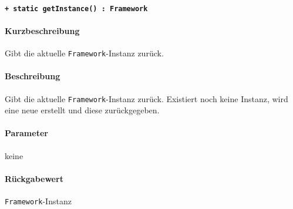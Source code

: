 \paragraph{\texttt{+ static getInstance() : Framework}}%
\paragraph*{Kurzbeschreibung}
Gibt die aktuelle \verb#Framework#-Instanz zurück.
\paragraph*{Beschreibung}
Gibt die aktuelle \verb#Framework#-Instanz zurück.
Existiert noch keine Instanz, wird eine neue erstellt und diese zurückgegeben.
\paragraph*{Parameter}
keine
\paragraph*{Rückgabewert}
\verb#Framework#-Instanz